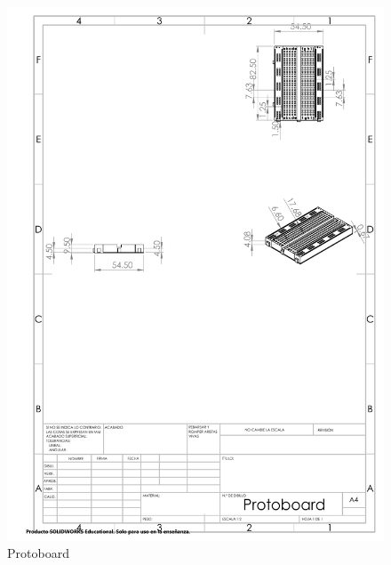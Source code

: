     \begin{figure}[H]
        \centering
        \includegraphics[trim = {10mm 100mm 0mm 0mm},clip,scale=0.2]{10/Img/protoboard.pdf}
        \caption{Protoboard}
        \label{Protoboard}
    \end{figure}
    
